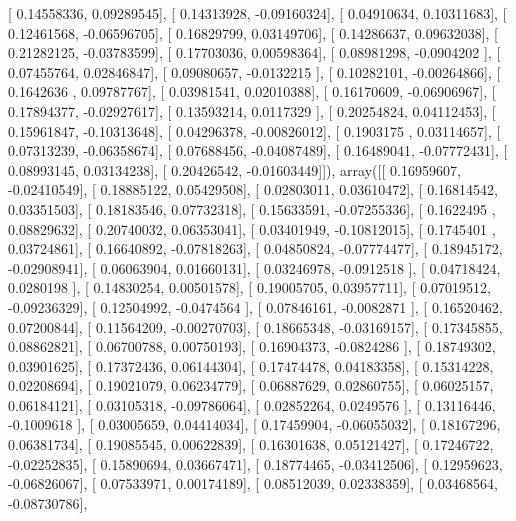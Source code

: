 \documentclass{article}
\begin{document}
       [ 0.14558336,  0.09289545],
       [ 0.14313928, -0.09160324],
       [ 0.04910634,  0.10311683],
       [ 0.12461568, -0.06596705],
       [ 0.16829799,  0.03149706],
       [ 0.14286637,  0.09632038],
       [ 0.21282125, -0.03783599],
       [ 0.17703036,  0.00598364],
       [ 0.08981298, -0.0904202 ],
       [ 0.07455764,  0.02846847],
       [ 0.09080657, -0.0132215 ],
       [ 0.10282101, -0.00264866],
       [ 0.1642636 ,  0.09787767],
       [ 0.03981541,  0.02010388],
       [ 0.16170609, -0.06906967],
       [ 0.17894377, -0.02927617],
       [ 0.13593214,  0.0117329 ],
       [ 0.20254824,  0.04112453],
       [ 0.15961847, -0.10313648],
       [ 0.04296378, -0.00826012],
       [ 0.1903175 ,  0.03114657],
       [ 0.07313239, -0.06358674],
       [ 0.07688456, -0.04087489],
       [ 0.16489041, -0.07772431],
       [ 0.08993145,  0.03134238],
       [ 0.20426542, -0.01603449]]), array([[ 0.16959607, -0.02410549],
       [ 0.18885122,  0.05429508],
       [ 0.02803011,  0.03610472],
       [ 0.16814542,  0.03351503],
       [ 0.18183546,  0.07732318],
       [ 0.15633591, -0.07255336],
       [ 0.1622495 ,  0.08829632],
       [ 0.20740032,  0.06353041],
       [ 0.03401949, -0.10812015],
       [ 0.1745401 ,  0.03724861],
       [ 0.16640892, -0.07818263],
       [ 0.04850824, -0.07774477],
       [ 0.18945172, -0.02908941],
       [ 0.06063904,  0.01660131],
       [ 0.03246978, -0.0912518 ],
       [ 0.04718424,  0.0280198 ],
       [ 0.14830254,  0.00501578],
       [ 0.19005705,  0.03957711],
       [ 0.07019512, -0.09236329],
       [ 0.12504992, -0.0474564 ],
       [ 0.07846161, -0.0082871 ],
       [ 0.16520462,  0.07200844],
       [ 0.11564209, -0.00270703],
       [ 0.18665348, -0.03169157],
       [ 0.17345855,  0.08862821],
       [ 0.06700788,  0.00750193],
       [ 0.16904373, -0.0824286 ],
       [ 0.18749302,  0.03901625],
       [ 0.17372436,  0.06144304],
       [ 0.17474478,  0.04183358],
       [ 0.15314228,  0.02208694],
       [ 0.19021079,  0.06234779],
       [ 0.06887629,  0.02860755],
       [ 0.06025157,  0.06184121],
       [ 0.03105318, -0.09786064],
       [ 0.02852264,  0.0249576 ],
       [ 0.13116446, -0.1009618 ],
       [ 0.03005659,  0.04414034],
       [ 0.17459904, -0.06055032],
       [ 0.18167296,  0.06381734],
       [ 0.19085545,  0.00622839],
       [ 0.16301638,  0.05121427],
       [ 0.17246722, -0.02252835],
       [ 0.15890694,  0.03667471],
       [ 0.18774465, -0.03412506],
       [ 0.12959623, -0.06826067],
       [ 0.07533971,  0.00174189],
       [ 0.08512039,  0.02338359],
       [ 0.03468564, -0.08730786],
\end{document}
